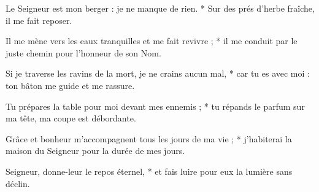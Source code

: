 \item Le Seigneur est mon berger : je ne manque de rien. * Sur des prés d'herbe fraîche, il me fait reposer.

\item Il me mène vers les eaux tranquilles et me fait revivre ; * il me conduit par le juste chemin pour l'honneur de son Nom.

\item Si je traverse les ravins de la mort, je ne crains aucun mal, * car tu es avec moi : ton bâton me guide et me rassure.

\item Tu prépares la table pour moi devant mes ennemis ; * tu répands le parfum sur ma tête, ma coupe est débordante.

\item Grâce et bonheur m'accompagnent tous les jours de ma vie ; * j'habiterai la maison du Seigneur pour la durée de mes jours.

\item Seigneur, donne-leur le repos éternel, * et fais luire pour eux la lumière sans déclin.